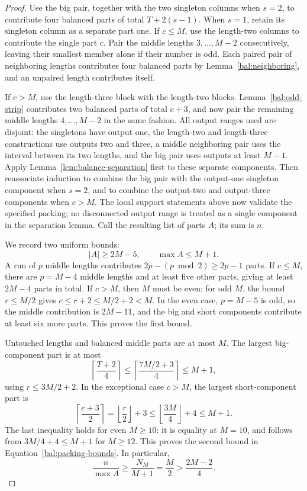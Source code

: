 \begin{proof}
Use the big pair, together with the two singleton columns when
$s=2$, to contribute four balanced parts of total $T+2(s-1)$.
When $s=1$, retain its singleton column as a separate part one.
If $c\le M$, use the length-two columns to contribute the single
part $c$.  Pair the middle lengths $3,\ldots,M-2$ consecutively,
leaving their smallest member alone if their number is odd.
Each paired pair of neighboring lengths contributes four balanced
parts by Lemma~\ref{bal:neighboring}, and an unpaired length
contributes itself.

If $c>M$, use the length-three block with the length-two blocks.
Lemma~\ref{bal:odd-strip} contributes two balanced parts of total
$c+3$, and now pair the remaining middle lengths $4,\ldots,M-2$
in the same fashion.  All output ranges used are disjoint:
the singletons have output one, the length-two and length-three
constructions use outputs two and three, a middle neighboring
pair uses the interval between its two lengths, and the big
pair uses outputs at least $M-1$.  Apply
Lemma~\ref{lem:balance-separation} first to these separate
components.  Then reassociate induction to combine the big
pair with the output-one singleton component when $s=2$, and
to combine the output-two and output-three components when
$c>M$.  The local support statements above now validate the
specified packing; no disconnected output range is treated
as a single component in the separation lemma.
Call the resulting list of parts $A$; its sum is $n$.

We record two uniform bounds:
\begin{equation}
 |A|\ge2M-5,
 \qquad \max A\le M+1.
 \label{bal:packing-bounds}
\end{equation}
A run of $p$ middle lengths contributes
$2p-(p\bmod2)\ge2p-1$ parts.  If $c\le M$, there are
$p=M-4$ middle lengths and at least five other parts, giving
at least $2M-4$ parts in total.  If $c>M$, then $M$ must be
even: for odd $M$, the bound $r\le M/2$ gives
$c\le r+2\le M/2+2<M$.  In the even case, $p=M-5$ is odd,
so the middle contribution is $2M-11$, and the big and short
components contribute at least six more parts.  This proves
the first bound.

Untouched lengths and balanced middle parts are at most $M$.
The largest big-component part is at most
\[
 \left\lceil\frac{T+2}{4}\right\rceil
 \le \left\lceil\frac{7M/2+3}{4}\right\rceil
 \le M+1,
\]
using $r\le3M/2+2$.  In the exceptional case $c>M$, the
largest short-component part is
\[
 \left\lceil\frac{c+3}{2}\right\rceil
   =\left\lfloor\frac r2\right\rfloor+3
   \le\left\lfloor\frac{3M}{4}\right\rfloor+4
   \le M+1.
\]
The last inequality holds for even $M\ge10$: it is equality
at $M=10$, and follows from $3M/4+4\le M+1$ for $M\ge12$.
This proves the second bound in
Equation~\eqref{bal:packing-bounds}.  In particular,
\begin{equation}
 \frac{n}{\max A}\ge\frac{N_M}{M+1}
      =\frac M2>\frac{2M-2}{4}.
 \label{bal:average-bound}
\end{equation}


\end{proof}
